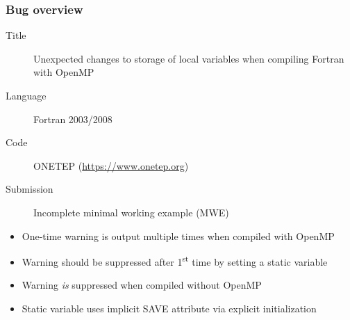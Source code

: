 \documentclass{beamer}
\begin{document}
\begin{frame}
  \frametitle{Bug overview}
    \begin{description}
      \item[Title] Unexpected changes to storage of local variables when compiling Fortran with OpenMP
      \item[Language] Fortran 2003/2008
      \item[Code] ONETEP (\url{https://www.onetep.org})
      \item[Submission] Incomplete minimal working example (MWE)
    \end{description}
    { \footnotesize
    \begin{itemize}
      \item One-time warning is output multiple times when compiled with OpenMP
      \item Warning should be suppressed after 1\textsuperscript{st} time by setting a static variable
      \item Warning \emph{is} suppressed when compiled without OpenMP
      \item Static variable uses implicit SAVE attribute via explicit initialization

\end{itemize}}
\end{frame}
\end{document}
